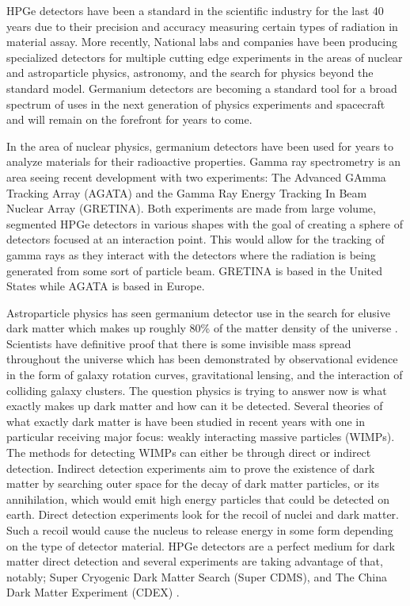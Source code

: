 HPGe detectors have been a standard in the scientific industry for the last 40 years due to their precision and accuracy measuring certain types of radiation in material assay.
More recently, National labs and companies have been producing specialized detectors for multiple cutting edge experiments in the areas of nuclear and astroparticle physics, astronomy, and the search for physics beyond the standard model.
Germanium detectors are becoming a standard tool for a broad spectrum of uses in the next generation of physics experiments and spacecraft and will remain on the forefront for years to come.

In the area of nuclear physics, germanium detectors have been used for years to analyze materials for their radioactive properties.
Gamma ray spectrometry is an area seeing recent development with two experiments: The Advanced GAmma Tracking Array (AGATA)\cite{agata} and the Gamma Ray Energy Tracking In Beam Nuclear Array (GRETINA)\cite{gretina}.
Both experiments are made from large volume, segmented HPGe detectors in various shapes with the goal of creating a sphere of detectors focused at an interaction point.
This would allow for the tracking of gamma rays as they interact with the detectors where the radiation is being generated from some sort of particle beam.
GRETINA is based in the United States while AGATA is based in Europe.

Astroparticle physics has seen germanium detector use in the search for elusive dark matter which makes up roughly 80\% of the matter density of the universe \cite{cdms}.
Scientists have definitive proof that there is some invisible mass spread throughout the universe which has been demonstrated by observational evidence in the form of galaxy rotation curves, gravitational lensing, and the interaction of colliding galaxy clusters.
The question physics is trying to answer now is what exactly makes up dark matter and how can it be detected.
Several theories of what exactly dark matter is have been studied in recent years with one in particular receiving major focus: weakly interacting massive particles (WIMPs).
The methods for detecting WIMPs can either be through direct or indirect detection.
Indirect detection experiments aim to prove the existence of dark matter by searching outer space for the decay of dark matter particles, or its annihilation, which would emit high energy particles that could be detected on earth.
Direct detection experiments look for the recoil of nuclei and dark matter.
Such a recoil would cause the nucleus to release energy in some form depending on the type of detector material.
HPGe detectors are a perfect medium for dark matter direct detection and several experiments are taking advantage of that, notably; Super Cryogenic Dark Matter Search (Super CDMS)\cite{cdms}, and The China Dark Matter Experiment (CDEX) \cite{cdex}.


